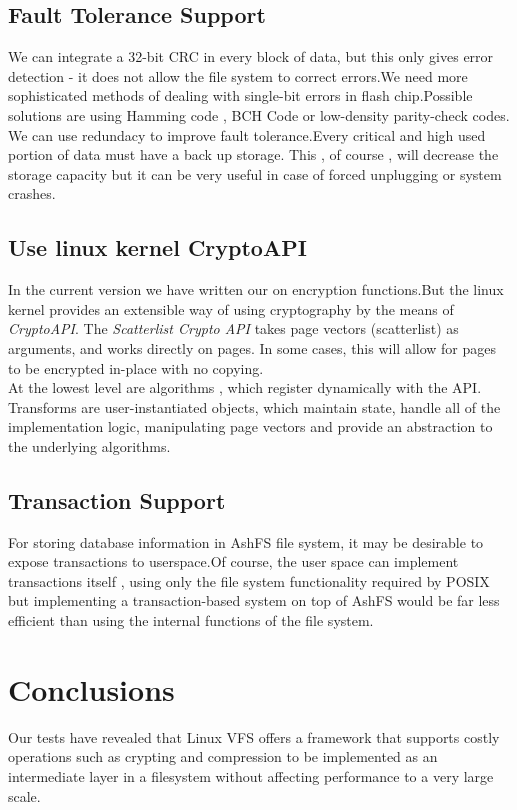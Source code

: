 \documentclass[conference]{IEEEtran}
\begin{document}
\subsection{Fault Tolerance Support}
We can integrate a 32-bit CRC in every block of data, but this only gives error detection - it does not
allow the file system to correct errors.We need more sophisticated methods of dealing with single-bit errors
in flash chip.Possible solutions are using Hamming code , BCH Code or low-density parity-check codes.\\

We can use redundacy to improve fault tolerance.Every critical and high used portion of data must have 
a back up storage. This , of course , will decrease the storage capacity but it can be very useful in 
case of forced unplugging or system crashes.

\subsection{Use linux kernel CryptoAPI}
In the current version we have written our on encryption functions.But the linux kernel provides	 
an extensible way of using cryptography by the means of {\em CryptoAPI}. The {\em Scatterlist Crypto API}
takes page vectors (scatterlist) as arguments, and works directly on pages. In some cases, this will allow for 
pages to be encrypted in-place with no copying. \\

At the lowest level are algorithms , which register dynamically with the API. Transforms are user-instantiated 
objects, which maintain state, handle all of the implementation logic, manipulating page vectors and 
provide an abstraction to the underlying algorithms.

\subsection{Transaction Support}
For storing database information in AshFS file system, it may be desirable to expose transactions 
to userspace.Of course, the user space can implement transactions itself , using only the file system 
functionality required by POSIX but implementing a transaction-based system on top of AshFS would 
be far less efficient than using the internal functions of the file system.

\section{Conclusions}
Our tests have revealed that Linux VFS offers a framework that supports costly operations such as
crypting and compression to be implemented as an intermediate layer in a filesystem without
affecting performance to a very large scale.\\
\end{document}
